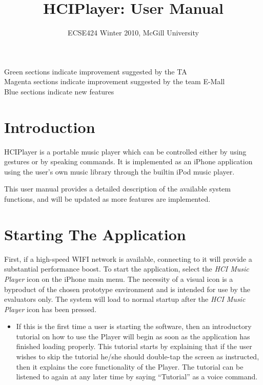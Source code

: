 \documentclass[12pt,letterpaper]{article}
\begin{document}
\title{HCIPlayer: User Manual}
\author{ECSE424 Winter 2010, McGill University}
\renewcommand{\today}{Updated: Wednesday, March 24th, 2010}
\maketitle

\begin{center}
{\color{green} Green} sections indicate improvement suggested by the TA \\
{\color{magenta} Magenta} sections indicate improvement suggested by the team E-Mall \\
{\color{blue} Blue} sections indicate new features
\end{center}

\section{Introduction}

HCIPlayer is a portable music player which can be controlled either by using gestures or by speaking commands. It is implemented as an iPhone application using the user's own music library through the builtin iPod music player.

This user manual provides a detailed description of the available system functions, and will be updated as more features are implemented.

\section{Starting The Application}
First, if a high-speed WIFI network is available, connecting to it will provide a substantial performance boost. To start the application, select the \emph{HCI Music Player} icon on the iPhone main menu. The necessity of a visual icon is a byproduct of the chosen prototype environment and is intended for use by the evaluators only. The system will load to normal startup after the \emph{HCI Music Player} icon has been pressed.
\begin{itemize}
\item If this is the first time a user is starting the software, then an introductory tutorial on how to use the Player will begin as soon as the application has finished loading properly. This tutorial starts by explaining that if the user wishes to skip the tutorial he/she should double-tap the screen as instructed, then it explains the core functionality of the Player. {\color{blue} The tutorial can be listened to again at any later time by saying ``Tutorial'' as a voice command.}
\end{itemize}
\end{document}
